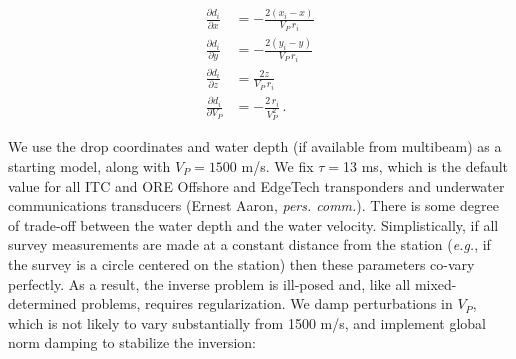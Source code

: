 \documentclass[10pt,titlepage]{article}
\begin{document}
\begin{align}
\frac{\partial d_i}{\partial x} &= 
	-\frac{2 (x_i - x)}{V_P \, r_i}\\
\frac{\partial d_i}{\partial y} &= 
	-\frac{2 (y_i - y)}{V_P \, r_i} \\
\frac{\partial d_i}{\partial z} &= 
	\frac{2 z}{V_P \, r_i} \\	
\frac{\partial d_i}{\partial V_P} &= 
	-\frac{2 \, r_i}{V_P^2} \,.
\end{align}

We use the drop coordinates and water depth (if available from multibeam) as a starting model, along with $V_P = 1500$ m/s. We fix $\tau =$13 ms, which is the default value for all ITC and ORE Offshore and EdgeTech transponders and underwater communications transducers (Ernest Aaron, \textit{pers. comm.}). There is some degree of trade-off between the water depth and the water velocity. Simplistically, if all survey measurements are made at a constant distance from the station (\textit{e.g.}, if the survey is a circle centered on the station) then these parameters co-vary perfectly. As a result, the inverse problem is ill-posed and, like all mixed-determined problems, requires regularization. We damp perturbations in $V_P$, which is not likely to vary substantially from 1500 m/s, and implement global norm damping to stabilize the inversion:
\end{document}
